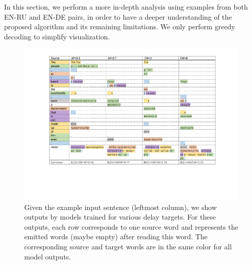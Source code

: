 In this section, we perform a more in-depth analysis using examples from both EN-RU and EN-DE pairs, in order to have a deeper understanding of the proposed algorithm and its remaining limitations. We only perform greedy decoding to simplify visualization. 
\begin{figure}[hptb]
   	\centering
  	\includegraphics[width=\linewidth]{figs/simultrans/example_c2.pdf} 
          	\caption{\label{cp9.fig.exp1} {Given the example input sentence (leftmost column), we show outputs by models trained for various delay targets. For these outputs, each row corresponds to one source word and represents the emitted words (maybe empty) after reading this word. The corresponding source and target words are in the same color for all model outputs.}}
\end{figure} 
